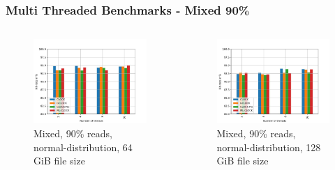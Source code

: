 \documentclass[
	aspectratio=169,
	compress,
]{beamer}
\newcommand{\navframetitle}[1]{\frametitle{#1\hfill{\footnotesize\lastsection{}}}}
\begin{document}
\begin{frame}[fragile]
	\navframetitle{Multi Threaded Benchmarks - Mixed 90\%}

	\begin{columns}
		\begin{column}{0.5\textwidth}
			\begin{figure}[ht]
    			\centering
    			\includegraphics[width=\textwidth]{multi_64_gb_rw_90to10_normal.jpg}
        		\caption{Mixed, 90\% reads, normal-distribution, 64 GiB file size}
			\end{figure}
		\end{column}
		\begin{column}{0.5\textwidth}
			\begin{figure}[ht]
    			\centering
    			\includegraphics[width=\textwidth]{multi_128_gb_rw_90to10_normal.jpg}
        		\caption{Mixed, 90\% reads, normal-distribution, 128 GiB file size}
			\end{figure}			
		\end{column}
	\end{columns}
\end{frame}
\end{document}
